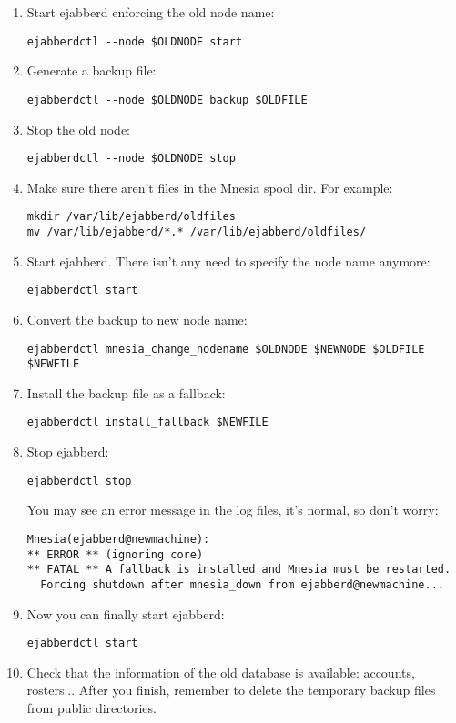 \documentclass[a4paper,10pt]{book}
\begin{document}
\begin{enumerate}
\item Start ejabberd enforcing the old node name:
\begin{verbatim}
ejabberdctl --node $OLDNODE start
\end{verbatim}

\item Generate a backup file:
\begin{verbatim}
ejabberdctl --node $OLDNODE backup $OLDFILE
\end{verbatim}

\item Stop the old node:
\begin{verbatim}
ejabberdctl --node $OLDNODE stop
\end{verbatim}

\item Make sure there aren't files in the Mnesia spool dir. For example:
\begin{verbatim}
mkdir /var/lib/ejabberd/oldfiles
mv /var/lib/ejabberd/*.* /var/lib/ejabberd/oldfiles/
\end{verbatim}

\item Start ejabberd. There isn't any need to specify the node name anymore:
\begin{verbatim}
ejabberdctl start
\end{verbatim}

\item Convert the backup to new node name:
\begin{verbatim}
ejabberdctl mnesia_change_nodename $OLDNODE $NEWNODE $OLDFILE $NEWFILE
\end{verbatim}

\item Install the backup file as a fallback:
\begin{verbatim}
ejabberdctl install_fallback $NEWFILE
\end{verbatim}

\item Stop ejabberd:
\begin{verbatim}
ejabberdctl stop
\end{verbatim}
You may see an error message in the log files, it's normal, so don't worry:
\begin{verbatim}
Mnesia(ejabberd@newmachine):
** ERROR ** (ignoring core)
** FATAL ** A fallback is installed and Mnesia must be restarted.
  Forcing shutdown after mnesia_down from ejabberd@newmachine...
\end{verbatim}

\item Now you can finally start ejabberd:
\begin{verbatim}
ejabberdctl start
\end{verbatim}

\item Check that the information of the old database is available: accounts, rosters...
After you finish, remember to delete the temporary backup files from public directories.
\end{enumerate}
\end{document}
